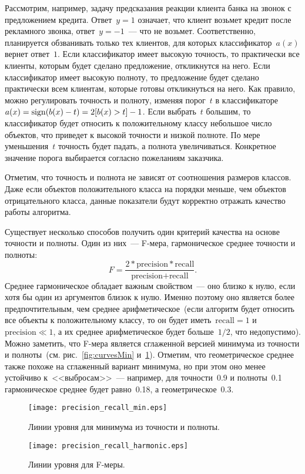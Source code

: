 \documentclass[12pt,fleqn]{article}
\begin{document}
Рассмотрим, например, задачу предсказания реакции клиента банка на звонок с предложением кредита.
Ответ~$y = 1$ означает, что клиент возьмет кредит после рекламного звонка,
ответ~$y = -1$~--- что не возьмет.
Соответственно, планируется обзванивать только тех клиентов, для которых
классификатор~$a(x)$ вернет ответ~$1$.
Если классификатор имеет высокую точность, то практически все клиенты, которым
будет сделано предложение, откликнутся на него.
Если классификатор имеет высокую полноту, то предложение будет сделано практически
всем клиентам, которые готовы откликнуться на него.
Как правило, можно регулировать точность и полноту, изменяя порог~$t$
в классификаторе~$a(x) = \mathop{\rm sign}\limits(b(x) - t) = 2 [b(x) > t] - 1$.
Если выбрать~$t$ большим, то классификатор будет относить к положительному классу
небольшое число объектов, что приведет к высокой точности и низкой полноте.
По мере уменьшения~$t$ точность будет падать, а полнота увеличиваться.
Конкретное значение порога выбирается согласно пожеланиям заказчика.

Отметим, что точность и полнота не зависят от соотношения размеров классов.
Даже если объектов положительного класса на порядки меньше,
чем объектов отрицательного класса, данные показатели будут корректно
отражать качество работы алгоритма.

Существует несколько способов получить один критерий качества
на основе точности и полноты.
Один из них~--- F-мера, гармоническое среднее точности и полноты:
\[
    F
    =
    \frac{
        2 * \text{precision} * \text{recall}
    }{
        \text{precision} + \text{recall}
    }.
\]
Среднее гармоническое обладает важным свойством~--- оно близко к нулю, если хотя бы
один из аргументов близок к нулю.
Именно поэтому оно является более предпочтительным, чем среднее арифметическое~(если
алгоритм будет относить все объекты к положительному классу,
то он будет иметь~$\text{recall} = 1$ и~$\text{precision} \ll 1$,
а их среднее арифметическое будет больше~$1/2$, что недопустимо).
Можно заметить, что F-мера является сглаженной версией минимума
из точности и полноты~(см. рис.~\ref{fig:curvesMin} и~\ref{fig:curvesHarmonic}).
Отметим, что геометрическое среднее также похоже на сглаженный вариант минимума,
но при этом оно менее устойчиво к~<<выбросам>>~--- например, для точности~0.9
и полноты~0.1 гармоническое среднее будет равно~0.18, а геометрическое~0.3.

\begin{figure}[t]
  \begin{multicols}{2}
    \hfill
    \texttt{[image: precision\_recall\_min.eps]}
    \hfill
    \caption{Линии уровня для минимума из точности и полноты.}
    \label{fig:curvesMin}
    \hfill
    \texttt{[image: precision\_recall\_harmonic.eps]}
    \hfill
    \caption{Линии уровня для F-меры.}
    \label{fig:curvesHarmonic}
  \end{multicols}
\end{figure}
\end{document}
